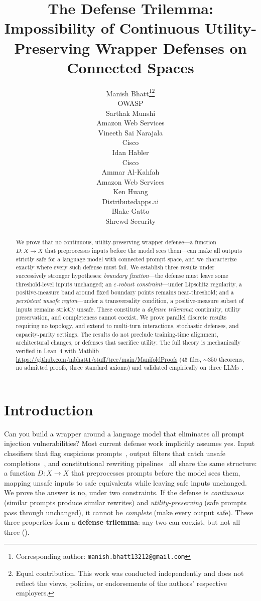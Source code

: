 \documentclass{article}
\title{The Defense Trilemma:\\
  Impossibility of Continuous Utility-Preserving Wrapper Defenses on Connected Spaces}
\author{%
  Manish Bhatt\thanks{Corresponding author: \texttt{manish.bhatt13212@gmail.com}}\thanks{Equal contribution. This work was conducted independently and does not reflect the views, policies, or endorsements of the authors' respective employers.} \\
  OWASP \\
  \And
  Sarthak Munshi\footnotemark[2] \\
  Amazon Web Services \\
  \And
  Vineeth Sai Narajala\footnotemark[2] \\
  Cisco \\
  \And
  Idan Habler\footnotemark[2] \\
  Cisco \\
  \And
  Ammar Al-Kahfah\footnotemark[2] \\
  Amazon Web Services \\
  \And
  Ken Huang \\
  Distributedapps.ai \\
  \And
  Blake Gatto \\
  Shrewd Security \\
}
\begin{document}
\maketitle
\begin{abstract}
We prove that no continuous, utility-preserving wrapper defense---a
function $D\colon X\to X$ that preprocesses inputs before the model
sees them---can make all outputs strictly safe for a language model
with connected prompt space, and we characterize exactly where every
such defense must fail. We establish three results under
successively stronger hypotheses: \emph{boundary fixation}---the defense must leave some
threshold-level inputs unchanged; an \emph{$\varepsilon$-robust
constraint}---under Lipschitz regularity, a positive-measure band
around fixed boundary points remains near-threshold; and a
\emph{persistent unsafe region}---under a transversality condition, a
positive-measure subset of inputs remains strictly unsafe. These
constitute a \emph{defense trilemma}: continuity, utility preservation,
and completeness cannot coexist. We prove parallel discrete results
requiring no topology, and extend to multi-turn interactions,
stochastic defenses, and capacity-parity settings. The results do not
preclude training-time alignment, architectural changes, or defenses
that sacrifice utility. The full theory is mechanically verified in
Lean~4 with Mathlib
\url{https://github.com/mbhatt1/stuff/tree/main/ManifoldProofs}
(45 files, ${\sim}350$ theorems, no admitted proofs, three standard
axioms) and validated empirically on three LLMs~\cite{munshi2026manifold}.
\end{abstract}


\section{Introduction}
\label{sec:intro}

Can you build a wrapper around a language model that eliminates all
prompt injection vulnerabilities? Most current defense work implicitly
assumes yes. Input classifiers that flag suspicious
prompts~\cite{alon2023detecting}, output filters that catch unsafe
completions~\cite{inan2023llama}, and constitutional rewriting
pipelines~\cite{bai2022constitutional} all share the same structure: a
function $D\colon X \to X$ that preprocesses prompts before the model
sees them, mapping unsafe inputs to safe equivalents while leaving safe
inputs unchanged. We prove the answer is no, under two constraints. If the defense
is \emph{continuous} (similar prompts produce similar rewrites) and
\emph{utility-preserving} (safe prompts pass through unchanged), it
cannot be \emph{complete} (make every output safe). These three
properties form a \textbf{defense trilemma}: any two can coexist, but
not all three ().
\end{document}
